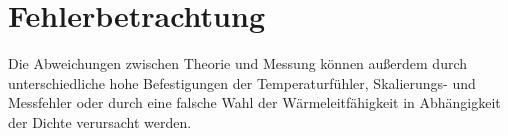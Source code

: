 \section{Fehlerbetrachtung}

Die Abweichungen zwischen Theorie und Messung können außerdem durch unterschiedliche hohe Befestigungen der Temperaturfühler, Skalierungs- und Messfehler oder durch eine falsche Wahl der Wärmeleitfähigkeit in Abhängigkeit der Dichte verursacht werden.   